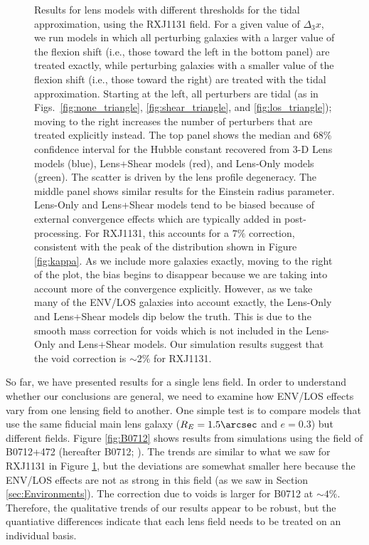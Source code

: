 \documentclass{emulateapj}
\begin{document}
\begin{figure}[ht]
\begin{center}
\caption{\label{fig:RXJ1131} Results for lens models with different thresholds for the tidal approximation, using the RXJ1131 field.  For a given value of $\Delta_3 x$, we run models in which all perturbing galaxies with a larger value of the flexion shift (i.e., those toward the left in the bottom panel) are treated exactly, while perturbing galaxies with a smaller value of the flexion shift (i.e., those toward the right) are treated with the tidal approximation.  Starting at the left, all perturbers are tidal (as in Figs.\ \ref{fig:none_triangle},  \ref{fig:shear_triangle}, and \ref{fig:los_triangle}); moving to the right increases the number of perturbers that are treated explicitly instead.  The top panel shows the median and 68\% confidence interval for the Hubble constant recovered from 3-D Lens models (blue), Lens+Shear models (red), and Lens-Only models (green). The scatter is driven by the lens profile degeneracy.  The middle panel shows similar results for the Einstein radius parameter. Lens-Only and Lens+Shear models tend to be biased because of external convergence effects which are typically added in post-processing. For RXJ1131, this accounts for a $7\%$ correction, consistent with the peak of the distribution shown in Figure \ref{fig:kappa}. As we include more galaxies exactly, moving to the right of the plot, the bias begins to disappear because we are taking into account more of the convergence explicitly. However, as we take many of the ENV/LOS galaxies into account exactly, the Lens-Only and Lens+Shear models dip below the truth. This is due to the smooth mass correction for voids which is not included in the Lens-Only and Lens+Shear models. Our simulation results suggest that the void correction is $\sim 2\%$ for RXJ1131.
}
\end{center}
\end{figure}

So far, we have presented results for a single lens field.  In order to understand whether our conclusions are general, we need to examine how ENV/LOS effects vary from one lensing field to another. One simple test is to compare models that use the same fiducial main lens galaxy ($R_E = 1.5\arcsec$ and $e=0.3$) but different fields.  Figure \ref{fig:B0712} shows results from simulations using the field of B0712+472 (hereafter B0712; \citealt{Jackson98}).  The trends are similar to what we saw for RXJ1131 in Figure \ref{fig:RXJ1131}, but the deviations are somewhat smaller here because the ENV/LOS effects are not as strong in this field (as we saw in Section \ref{sec:Environments}).  The correction due to voids is larger for B0712 at $\sim4\%$. Therefore, the qualitative trends of our results appear to be robust, but the quantiative differences indicate that each lens field needs to be treated on an individual basis.
\end{document}
